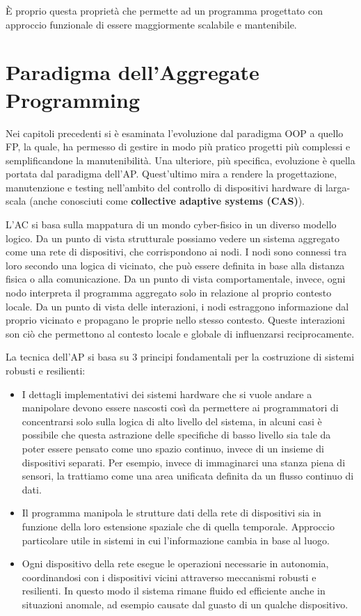 \documentclass[12pt,a4paper,openright,twoside]{book}
\begin{document}
È proprio questa proprietà che permette ad un programma progettato con approccio funzionale di essere maggiormente scalabile e mantenibile.

\section{Paradigma dell'Aggregate Programming}

Nei capitoli precedenti si è esaminata l'evoluzione dal paradigma \ac{OOP} a quello \ac{FP}, la quale, ha permesso di gestire in modo più pratico progetti più complessi e semplificandone la manutenibilità. Una ulteriore, più specifica, evoluzione è quella portata dal paradigma dell'\ac{AP}. Quest'ultimo mira a rendere la progettazione, manutenzione e testing nell'ambito del controllo di dispositivi hardware di larga-scala (anche conosciuti come \textbf{collective adaptive systems (CAS)}).

L'\ac{AC} si basa sulla mappatura di un mondo cyber-fisico in un diverso modello logico. Da un punto di vista strutturale possiamo vedere un sistema aggregato come una rete di dispositivi, che corrispondono ai nodi. I nodi sono connessi tra loro secondo una logica di vicinato, che può essere definita in base alla distanza fisica o alla comunicazione. Da un punto di vista comportamentale, invece, ogni nodo interpreta il programma aggregato solo in relazione al proprio contesto locale. Da un punto di vista delle interazioni, i nodi estraggono informazione dal proprio vicinato e propagano le proprie nello stesso contesto. Queste interazioni son ciò che permettono al contesto locale e globale di influenzarsi reciprocamente.

La tecnica dell'\ac{AP} si basa su 3 principi fondamentali per la costruzione di sistemi robusti e resilienti:

\begin{itemize}
    \item I dettagli implementativi dei sistemi hardware che si vuole andare a manipolare devono essere nascosti così da permettere ai programmatori di concentrarsi solo sulla logica di alto livello del sistema, in alcuni casi è possibile che questa astrazione delle specifiche di basso livello sia tale da poter essere pensato come uno spazio continuo, invece di un insieme di dispositivi separati. Per esempio, invece di immaginarci una stanza piena di sensori, la trattiamo come una area unificata definita da un flusso continuo di dati.
    \item Il programma manipola le strutture dati della rete di dispositivi sia in funzione della loro estensione spaziale che di quella temporale. Approccio particolare utile in sistemi in cui l'informazione cambia in base al luogo.
    \item Ogni dispositivo della rete esegue le operazioni necessarie in autonomia, coordinandosi con i dispositivi vicini attraverso meccanismi robusti e resilienti. In questo modo il sistema rimane fluido ed efficiente anche in situazioni anomale, ad esempio causate dal guasto di un qualche dispositivo.
\end{itemize}
\end{document}
